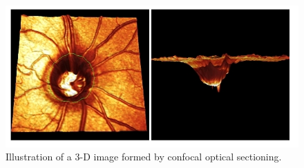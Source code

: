 \begin{figure}[H]
\centering
\includegraphics{figures/3dcslo}
\caption{Illustration of a 3-D image formed by confocal optical sectioning.\cite{sharp2004scanning}}
\label{fig:3d}
\end{figure}

